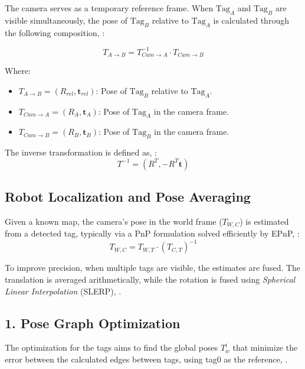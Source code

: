 The camera serves as a temporary reference frame. When $\text{Tag}_A$ and $\text{Tag}_B$ are visible simultaneously, the pose of $\text{Tag}_B$ relative to $\text{Tag}_A$ is calculated through the following composition, \cite{lynch2017modern}:

\begin{equation}
	T_{A \to B} = T_{Cam \to A}^{-1} \cdot T_{Cam \to B}
\end{equation}

Where:
\begin{itemize}
	\item $T_{A \to B} = (R_{rel}, \bm{t}_{rel})$: Pose of $\text{Tag}_B$ relative to $\text{Tag}_A$.
	\item $T_{Cam \to A} = (R_A, \bm{t}_A)$: Pose of $\text{Tag}_A$ in the camera frame.
	\item $T_{Cam \to B} = (R_B, \bm{t}_B)$: Pose of $\text{Tag}_B$ in the camera frame.
\end{itemize}

The inverse transformation is defined as, \cite{lynch2017modern}:
\begin{equation}
	T^{-1} = (R^T, -R^T \bm{t})
\end{equation}

\subsection{Robot Localization and Pose Averaging}

Given a known map, the camera's pose in the world frame ($T_{W,C}$) is estimated from a detected tag, typically via a PnP formulation solved efficiently by EPnP, \cite{lepetit2009epnp}:
\begin{equation}
	T_{W,C} = T_{W,T} \cdot (T_{C,T})^{-1}
\end{equation}

To improve precision, when multiple tags are visible, the estimates are fused. The translation is averaged arithmetically, while the rotation is fused using \textit{Spherical Linear Interpolation} (SLERP), \cite{shoemake1985slerp}.



\subsection{1. Pose Graph Optimization}

The optimization for the tags aims to find the global poses $T_w^i$ that minimize the error between the calculated edges between tags, using tag0 as the reference, \cite{barfoot2024state}.

